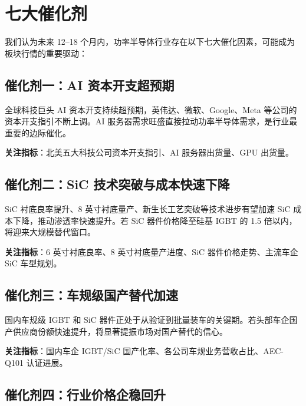 
\section{七大催化剂}

我们认为未来 12–18 个月内，功率半导体行业存在以下七大催化因素，可能成为板块行情的重要驱动：

\subsection{催化剂一：AI 资本开支超预期}

全球科技巨头 AI 资本开支持续超预期，英伟达、微软、Google、Meta 等公司的资本开支指引不断上调。AI 服务器需求旺盛直接拉动功率半导体需求，是行业最重要的边际催化。

\vspace{0.3em}

\textbf{关注指标}：北美五大科技公司资本开支指引、AI 服务器出货量、GPU 出货量。

\subsection{催化剂二：SiC 技术突破与成本快速下降}

SiC 衬底良率提升、8 英寸衬底量产、新生长工艺突破等技术进步有望加速 SiC 成本下降，推动渗透率快速提升。若 SiC 器件价格降至硅基 IGBT 的 1.5 倍以内，将迎来大规模替代窗口。

\vspace{0.3em}

\textbf{关注指标}：6 英寸衬底良率、8 英寸衬底量产进度、SiC 器件价格走势、主流车企 SiC 车型规划。

\subsection{催化剂三：车规级国产替代加速}

国内车规级 IGBT 和 SiC 器件正处于从验证到批量装车的关键期。若头部车企国产供应商份额快速提升，将显著提振市场对国产替代的信心。

\vspace{0.3em}

\textbf{关注指标}：国内车企 IGBT/SiC 国产化率、各公司车规业务营收占比、AEC-Q101 认证进展。

\subsection{催化剂四：行业价格企稳回升}

